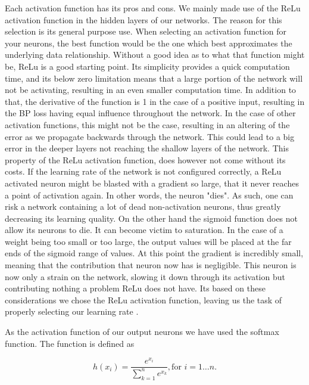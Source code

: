 Each activation function has its pros and cons. We mainly made use of the
\gls{ReLu} activation function in the hidden layers of our networks. The reason
for this selection is its general purpose use. When selecting an activation
function for your neurons, the best function would be the one which best
approximates the underlying data relationship. Without a good idea as to what
that function might be, \gls{ReLu} is a good starting point. Its simplicity
provides a quick computation time, and its below zero limitation means that
a large portion of the network will not be activating, resulting in an even
smaller computation time. In addition to that, the derivative of the function
is 1 in the case of a positive input, resulting in the \gls{BP} loss having
equal influence throughout the network. In the case of other activation
functions, this might not be the case, resulting in an altering of the error
as we propagate backwards through the network. This could lead to a big error
in the deeper layers not reaching the shallow layers of the network. This
property of the \gls{ReLu} activation function, does however not come without
its costs. If the learning rate of the network is not configured correctly, a
\gls{ReLu} activated neuron might be blasted with a gradient so large, that it
never reaches a point of activation again. In other words, the neuron "dies". As
such, one can risk a network containing a lot of dead non-activation neurons,
thus greatly decreasing its learning quality. On the other hand the sigmoid
function does not allow its neurons to die. It can become victim to saturation.
In the case of a weight being too small or too large, the output values will
be placed at the far ends of the sigmoid range of values. At this point the
gradient is incredibly small, meaning that the contribution that neuron now
has is negligible. This neuron is now only a strain on the network, slowing
it down through its activation but contributing nothing a problem \gls{ReLu}
does not have. Its based on these considerations we chose the \gls{ReLu}
activation function, leaving us the task of properly selecting our learning rate
\citep{JiYan, AndrejKarpathy, AvinashSharmaV}.

As the activation function of our output neurons we have used the softmax
function. The function is defined as

\begin{equation}
    h(x_i) = \frac{e^{x_i}}{\sum_{k=1}^n e^{x_k}}, \text{for $i = 1 \dots n$}.
\end{equation}

